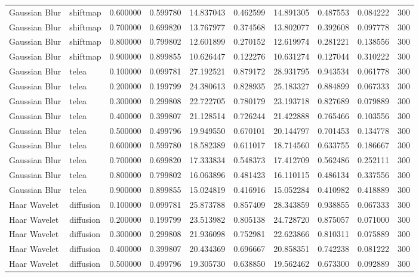 \begin{table}[h]
\begin{tabular}{llrrrrrrrr}
Gaussian Blur & shiftmap & 0.600000 & 0.599780 & 14.837043 & 0.462599 & 14.891305 & 0.487553 & 0.084222 & 300 \\
Gaussian Blur & shiftmap & 0.700000 & 0.699820 & 13.767977 & 0.374568 & 13.802077 & 0.392608 & 0.097778 & 300 \\
Gaussian Blur & shiftmap & 0.800000 & 0.799802 & 12.601899 & 0.270152 & 12.619974 & 0.281221 & 0.138556 & 300 \\
Gaussian Blur & shiftmap & 0.900000 & 0.899855 & 10.626447 & 0.122276 & 10.631274 & 0.127044 & 0.310222 & 300 \\
Gaussian Blur & telea & 0.100000 & 0.099781 & 27.192521 & 0.879172 & 28.931795 & 0.943534 & 0.061778 & 300 \\
Gaussian Blur & telea & 0.200000 & 0.199799 & 24.380613 & 0.828935 & 25.183327 & 0.884899 & 0.067333 & 300 \\
Gaussian Blur & telea & 0.300000 & 0.299808 & 22.722705 & 0.780179 & 23.193718 & 0.827689 & 0.079889 & 300 \\
Gaussian Blur & telea & 0.400000 & 0.399807 & 21.128514 & 0.726244 & 21.422888 & 0.765466 & 0.103556 & 300 \\
Gaussian Blur & telea & 0.500000 & 0.499796 & 19.949550 & 0.670101 & 20.144797 & 0.701453 & 0.134778 & 300 \\
Gaussian Blur & telea & 0.600000 & 0.599780 & 18.582389 & 0.611017 & 18.714560 & 0.633755 & 0.186667 & 300 \\
Gaussian Blur & telea & 0.700000 & 0.699820 & 17.333834 & 0.548373 & 17.412709 & 0.562486 & 0.252111 & 300 \\
Gaussian Blur & telea & 0.800000 & 0.799802 & 16.063896 & 0.481423 & 16.110115 & 0.486134 & 0.337556 & 300 \\
Gaussian Blur & telea & 0.900000 & 0.899855 & 15.024819 & 0.416916 & 15.052284 & 0.410982 & 0.418889 & 300 \\
Haar Wavelet & diffusion & 0.100000 & 0.099781 & 25.873788 & 0.857409 & 28.343859 & 0.938855 & 0.067333 & 300 \\
Haar Wavelet & diffusion & 0.200000 & 0.199799 & 23.513982 & 0.805138 & 24.728720 & 0.875057 & 0.071000 & 300 \\
Haar Wavelet & diffusion & 0.300000 & 0.299808 & 21.936098 & 0.752981 & 22.623866 & 0.810311 & 0.075889 & 300 \\
Haar Wavelet & diffusion & 0.400000 & 0.399807 & 20.434369 & 0.696667 & 20.858351 & 0.742238 & 0.081222 & 300 \\
Haar Wavelet & diffusion & 0.500000 & 0.499796 & 19.305730 & 0.638850 & 19.562462 & 0.673300 & 0.092889 & 300 \\

\end{tabular}
\end{table}
